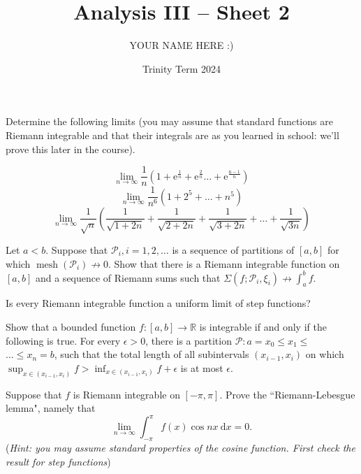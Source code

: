 \documentclass[answers]{exam}
\title{Analysis III -- Sheet 2}
\author{YOUR NAME HERE :)}
\date{Trinity Term 2024}
\begin{document}
\maketitle
\begin{questions}

\question%
Determine the following limits (you may assume that standard functions are Riemann integrable and that their integrals are as you learned in school: we'll prove this later in the course).
\begin{subparts}
\subpart \[
\lim _{n \rightarrow \infty} \frac{1}{n}\left(1+\mathrm{e}^{\frac{1}{n}}+\mathrm{e}^{\frac{2}{n}} \ldots+\mathrm{e}^{\frac{\mathrm{n}-1}{n}}\right)
\]
\subpart \[
\lim _{n \rightarrow \infty} \frac{1}{n^{6}}\left(1+2^{5}+\ldots+n^{5}\right)
\]
\subpart \[
	\lim _{n \rightarrow \infty} \frac{1}{\sqrt{n}}\left(\frac{1}{\sqrt{1+2 n}}+\frac{1}{\sqrt{2+2 n}}+\frac{1}{\sqrt{3+2 n}}+\ldots+\frac{1}{\sqrt{3 n}}\right)
\]
\end{subparts}



\question%
Let $a<b$. Suppose that $\mathcal{P}_{i}, i=1,2, \ldots$ is a sequence of partitions of $[a, b]$ for which $\operatorname{mesh}\left(\mathcal{P}_{i}\right) \nrightarrow 0$. Show that there is a Riemann integrable function on $[a, b]$ and a sequence of Riemann sums such that $\Sigma\left(f ; \mathcal{P}_{i}, \xi_{i}\right) \nrightarrow \int_{a}^{b} f$.



\question%
Is every Riemann integrable function a uniform limit of step functions?



\question%
Show that a bounded function $f:[a, b] \rightarrow \mathbb{R}$ is integrable if and only if the following is true. For every $\epsilon>0$, there is a partition $\mathcal{P}: a=x_{0} \leqslant x_{1} \leqslant$ $\ldots \leqslant x_{n}=b$, such that the total length of all subintervals $\left(x_{i-1}, x_{i}\right)$ on which $\sup _{x \in\left(x_{i-1}, x_{i}\right)} f>\inf _{x \in\left(x_{i-1}, x_{i}\right)} f+\epsilon$ is at most $\epsilon$.



\question%
Suppose that $f$ is Riemann integrable on $[-\pi, \pi]$. Prove the ``Riemann-Lebesgue lemma", namely that \[
	\lim _{n \rightarrow \infty} \int_{-\pi}^{\pi} f(x) \cos n x ~\mathrm d x=0.
\] (\emph{Hint: you may assume standard properties of the cosine function. First check the result for step functions})

\end{questions}
\end{document}
